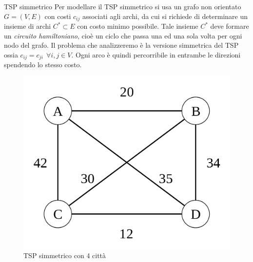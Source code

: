 \documentclass[10pt]{beamer}
\begin{document}
    \begin{frame}{TSP simmetrico}
        Per modellare il TSP simmetrico si usa un grafo non orientato $G=(V,E)$ con costi $c_{ij}$ associati agli archi, da cui si richiede di determinare un insieme di archi $C^* \subset E$ con costo minimo possibile.
        Tale insieme $C^*$ deve formare un \textit{circuito hamiltoniano}, cioè un ciclo che passa una ed una sola volta per ogni nodo del grafo.
        Il problema che analizzeremo è la versione simmetrica del TSP ossia $c_{ij} = c_{ji} \:\: \forall i,j \in V$.
        Ogni arco è quindi percorribile in entrambe le direzioni spendendo lo stesso costo.
        \begin{figure}
            \centering
            \includegraphics[scale=0.11]{files/SimmetricTSP}
            \caption{TSP simmetrico con 4 città}\label{fig:figure2}
        \end{figure}
    \end{frame}
\end{document}

